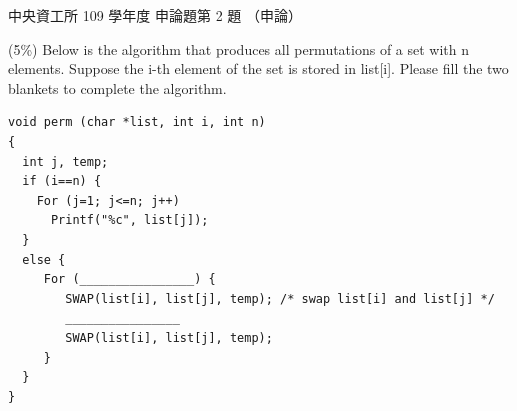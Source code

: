 \begin{pastexam}[label={px:ncu-109-dsa-13}]{中央資工所 109 學年度 申論題第 2 題}
（申論）

(5\%) Below is the algorithm that produces all permutations of a set with n elements. Suppose the
i-th element of the set is stored in list[i]. Please fill the two blankets to complete the algorithm.
\begin{verbatim}
void perm (char *list, int i, int n)
{
  int j, temp;
  if (i==n) {
    For (j=1; j<=n; j++)
      Printf("%c", list[j]);
  }
  else {
     For (________________) {
        SWAP(list[i], list[j], temp); /* swap list[i] and list[j] */
        ________________
        SWAP(list[i], list[j], temp);
     }
  }
}
\end{verbatim}
\end{pastexam}

